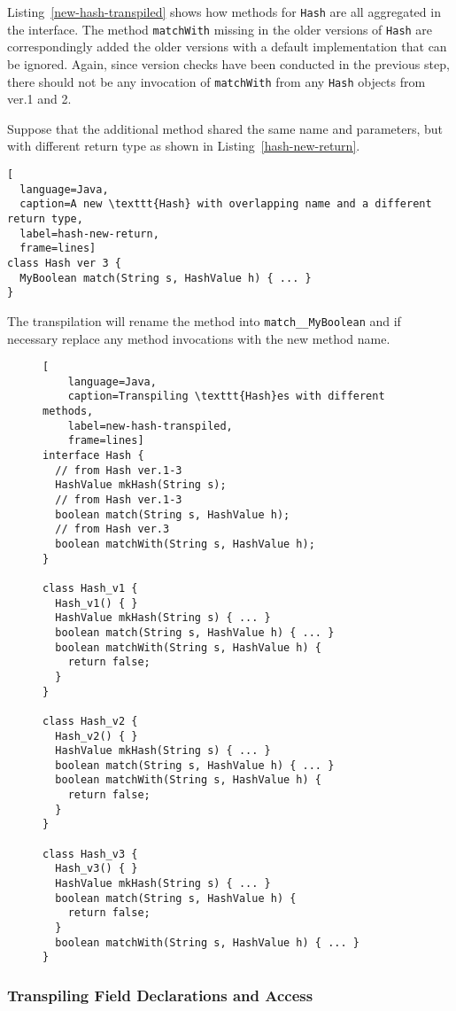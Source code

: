 Listing~\ref{new-hash-transpiled} shows how methods for \texttt{Hash} are all aggregated in the interface. 
The method \texttt{matchWith} missing in the older versions of \texttt{Hash} are correspondingly 
added the older versions with a default implementation that can be ignored. 
Again, since version checks have been conducted in the previous step, there should not be any 
invocation of \texttt{matchWith} from any \texttt{Hash} objects from ver.1 and 2.

Suppose that the additional method shared the same name and parameters, but with different 
return type as shown in Listing~\ref{hash-new-return}. 
\begin{lstlisting}[
  language=Java,
  caption=A new \texttt{Hash} with overlapping name and a different return type,
  label=hash-new-return,
  frame=lines]
class Hash ver 3 {
  MyBoolean match(String s, HashValue h) { ... }
}
\end{lstlisting}
The transpilation will rename the method into \texttt{match\_\_MyBoolean} and if necessary 
replace any method invocations with the new method name.

\begin{figure}[h!]
\begin{lstlisting}[
    language=Java,
    caption=Transpiling \texttt{Hash}es with different methods,
    label=new-hash-transpiled,
    frame=lines]
interface Hash {
  // from Hash ver.1-3
  HashValue mkHash(String s);
  // from Hash ver.1-3
  boolean match(String s, HashValue h);
  // from Hash ver.3
  boolean matchWith(String s, HashValue h);
}

class Hash_v1 {
  Hash_v1() { }
  HashValue mkHash(String s) { ... }
  boolean match(String s, HashValue h) { ... }
  boolean matchWith(String s, HashValue h) {
    return false;
  }
}

class Hash_v2 {
  Hash_v2() { }
  HashValue mkHash(String s) { ... }
  boolean match(String s, HashValue h) { ... }
  boolean matchWith(String s, HashValue h) {
    return false;
  }
}

class Hash_v3 {
  Hash_v3() { }
  HashValue mkHash(String s) { ... }
  boolean match(String s, HashValue h) {
    return false;
  }
  boolean matchWith(String s, HashValue h) { ... }
}
\end{lstlisting}
\end{figure}

\subsubsection*{Transpiling Field Declarations and Access}

